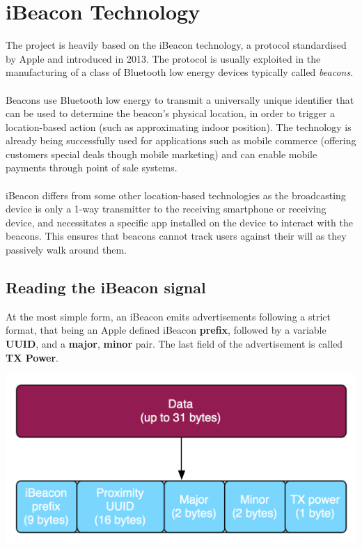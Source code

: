 \section{iBeacon Technology}

The project is heavily based on the iBeacon technology, a protocol standardised by Apple and introduced in 2013. The protocol is usually exploited in the manufacturing of a class of Bluetooth low energy devices typically called \textit{beacons}. 

\paragraph{}
Beacons use Bluetooth low energy to transmit a universally unique identifier that can be used to determine the beacon's physical location, in order to trigger a location-based action (such as approximating indoor position). The technology is already being successfully used for applications such as mobile commerce (offering customers special deals though mobile marketing) and can enable mobile payments through point of sale systems. 

\paragraph{}
iBeacon differs from some other location-based technologies as the broadcasting device is only a 1-way transmitter to the receiving smartphone or receiving device, and necessitates a specific app installed on the device to interact with the beacons. This ensures that beacons cannot track users against their will as they passively walk around them.

\subsection{Reading the iBeacon signal}

At the most simple form, an iBeacon emits advertisements following a strict format, that being an Apple defined iBeacon \textbf{prefix}, followed by a variable \textbf{UUID}, and a \textbf{major}, \textbf{minor} pair. The last field of the advertisement is called \textbf{TX Power}.

\begin{center}
\includegraphics[scale=0.5]{img/ibeacon-advertisement}	
\end{center}

